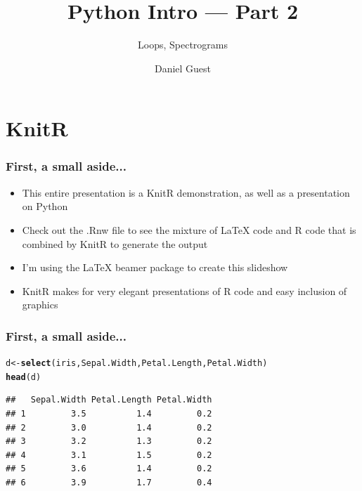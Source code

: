 \documentclass{beamer}\usepackage[]{graphicx}\usepackage[]{color}
\title{Python Intro --- Part 2}
\subtitle{Loops, Spectrograms}
\author{Daniel Guest}
\makeatletter
\newcommand{\hlstd}[1]{\textcolor[rgb]{0.345,0.345,0.345}{#1}}%
\newcommand{\hlkwb}[1]{\textcolor[rgb]{0.69,0.353,0.396}{#1}}%
\newcommand{\hlkwd}[1]{\textcolor[rgb]{0.737,0.353,0.396}{\textbf{#1}}}%
\newenvironment{kframe}{%
 \def\at@end@of@kframe{}%
 \ifinner\ifhmode%
  \def\at@end@of@kframe{\end{minipage}}%
  \begin{minipage}{\columnwidth}%
 \fi\fi%
 \def\FrameCommand##1{\hskip\@totalleftmargin \hskip-\fboxsep
 \colorbox{shadecolor}{##1}\hskip-\fboxsep
     \hskip-\linewidth \hskip-\@totalleftmargin \hskip\columnwidth}%
 \MakeFramed {\advance\hsize-\width
   \@totalleftmargin\z@ \linewidth\hsize
   \@setminipage}}%
 {\par\unskip\endMakeFramed%
 \at@end@of@kframe}
\newenvironment{knitrout}{}{} %
\makeatother
\begin{document}
\maketitle

\tableofcontents

\section{KnitR}

\begin{frame}[fragile]
\frametitle{First, a small aside...}
\begin{itemize}
	\item This entire presentation is a KnitR demonstration, as well as a presentation on Python

	\item Check out the .Rnw file to see the mixture of \LaTeX{} code and R code that is combined by KnitR to generate the output
	
	\item I'm using the \LaTeX{} beamer package to create this slideshow

	\item KnitR makes for very elegant presentations of R code and easy inclusion of graphics
\end{itemize}
\end{frame}

\begin{frame}[fragile]
\frametitle{First, a small aside...}


\begin{knitrout}
\color{fgcolor}\begin{kframe}
\begin{alltt}
\hlstd{d} \hlkwb{<-} \hlkwd{select}\hlstd{(iris, Sepal.Width, Petal.Length, Petal.Width)}
\hlkwd{head}\hlstd{(d)}
\end{alltt}
\begin{verbatim}
##   Sepal.Width Petal.Length Petal.Width
## 1         3.5          1.4         0.2
## 2         3.0          1.4         0.2
## 3         3.2          1.3         0.2
## 4         3.1          1.5         0.2
## 5         3.6          1.4         0.2
## 6         3.9          1.7         0.4
\end{verbatim}
\end{kframe}
\end{knitrout}
\end{frame}
\end{document}
